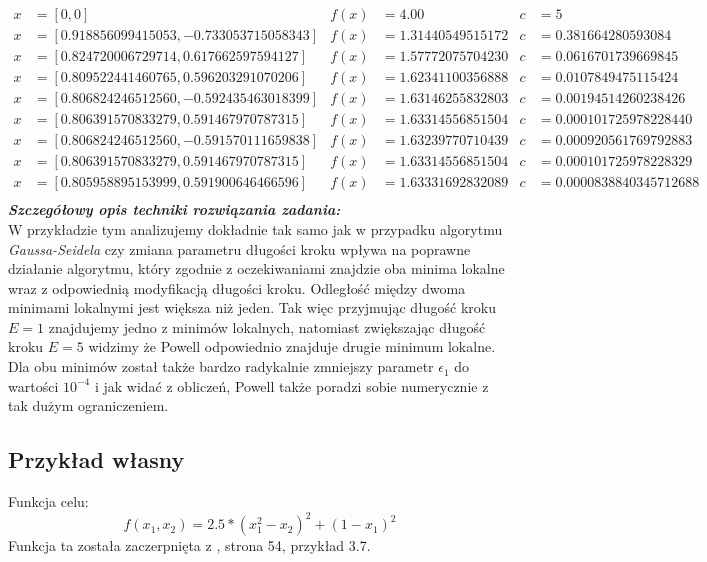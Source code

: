 \documentclass[a4paper,12pt]{article}
\begin{document}
\begin{align*}
x &= [0, 0] & 
f(x) &= 4.00 &
c &= 5 \\
x &= [0.918856099415053, -0.733053715058343] & 
f(x) &= 1.31440549515172 &
c &= 0.381664280593084 \\
x &= [0.824720006729714, 0.617662597594127] & 
f(x) &= 1.57772075704230 &
c &= 0.0616701739669845 \\
x &= [0.809522441460765, 0.596203291070206] & 
f(x) &= 1.62341100356888 &
c &= 0.0107849475115424 \\
x &= [0.806824246512560, -0.592435463018399] & 
f(x) &= 1.63146255832803 &
c &= 0.00194514260238426 \\
x &= [0.806391570833279, 0.591467970787315] & 
f(x) &= 1.63314556851504 &
c &= 0.000101725978228440 \\
x &= [0.806824246512560,-0.591570111659838] & 
f(x) &= 1.63239770710439 &
c &= 0.000920561769792883 \\
x &= [0.806391570833279, 0.591467970787315] & 
f(x) &= 1.63314556851504 &
c &= 0.000101725978228329 \\
x &= [0.805958895153999, 0.591900646466596] & 
f(x) &= 1.63331692832089 &
c &= 0.0000838840345712688 \\
\end{align*}
\newline
\textbf{\textit{Szczegółowy opis techniki rozwiązania zadania:}} \\
W przykładzie tym analizujemy dokładnie tak samo jak w przypadku algorytmu \textit{Gaussa-Seidela} czy zmiana parametru długości kroku wpływa na poprawne działanie algorytmu, który zgodnie z oczekiwaniami znajdzie oba minima lokalne wraz z odpowiednią modyfikacją długości kroku. Odległość między dwoma minimami lokalnymi jest większa niż jeden. Tak więc przyjmując długość kroku $E = 1$ znajdujemy jedno z minimów lokalnych, natomiast zwiększając długość kroku $E = 5$ widzimy że Powell odpowiednio znajduje drugie minimum lokalne. Dla obu minimów został także bardzo radykalnie zmniejszy parametr $\epsilon_{1}$ do wartości $10^{-4}$ i jak widać z obliczeń, Powell także poradzi sobie numerycznie z tak dużym ograniczeniem.

\newpage
\subsection{Przykład własny}
Funkcja celu:
\begin{equation}
    f(x_{1}, x_{2}) = 2.5*(x_{1}^{2} - x_{2})^{2} + (1 - x_{1})^{2}
\end{equation}
\newline
Funkcja ta została zaczerpnięta z \cite{bibitem2}, strona 54, przykład 3.7.
\end{document}
